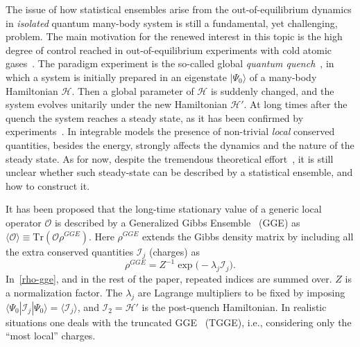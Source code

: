 \documentclass[twocolumn,superscriptaddress,prb,10pt]{revtex4-1}
\begin{document}
The issue of how statistical ensembles arise from the out-of-equilibrium 
dynamics in {\it isolated} quantum many-body system is still a fundamental, 
yet challenging, problem. The main motivation for the renewed interest 
in this topic is the high degree of control reached in out-of-equilibrium 
experiments with cold atomic gases~\cite{bloch-2008,greiner-2002,kinoshita-2006,
hofferberth-2007,trotzky-2012,gring-2012,cheneau-2012,
schneider-2012,kunhert-2013,langen-2013,meinert-2013,fukuhara-2013,
ronzheimer-2013,braun-2014,langen-2015}. The paradigm experiment is the so-called global 
{\it quantum quench}~\cite{polkovnikov-2011}, in which a system is initially 
prepared in an eigenstate $|\Psi_0\rangle$ of a many-body Hamiltonian ${\mathcal 
H}$. Then a global parameter of ${\mathcal H}$ is suddenly changed, and the 
system evolves unitarily under the new Hamiltonian ${\mathcal H}'$. At long times 
after the quench the system reaches a steady state, as it has been confirmed by 
experiments~\cite{kinoshita-2006}. In integrable models the 
presence of non-trivial {\it local} conserved quantities, besides the energy, 
strongly affects the dynamics and the nature of the steady state. As for now,  
despite the tremendous theoretical effort~\cite{calabrese-2006,rigol-2007,calabrese-2007,
kollath-2007,manmana-2007,rigol-2008,cramer-2008,barthel-2008,kollar-2008,moeckel-2008,
iucci-2009,rossini-2009,barmettler-2009,biroli-2010,rossini-2010,fioretto-2010,
gogolin-2011,banuls-2011,calabrese-2011,rigol-2011,calabrese-2012,caux-2012,essler-2012,
cazalilla-2012,mossel-2012a,collura-2013,mussardo-2013,caux-2013,fagotti-2013a,fagotti-2013,
sotiriadis-2014,fagotti-2014,essler-2014,goldstein-2014,de-nardis-2014,wright-2014,
pozsgay-2014,wouters-2014,mestyian-2015,ilievski-2015a}, 
it is still unclear whether such steady-state can be described by a statistical 
ensemble, and how to construct it. 

It has been proposed that the long-time stationary value of a generic 
local operator ${\mathcal O}$ is described by a Generalized Gibbs Ensemble~\cite{
rigol-2007,rigol-2008} (GGE) as $\langle{\mathcal O}\rangle\equiv\textrm{Tr}({\mathcal O}
\rho^{GGE})$. Here $\rho^{GGE}$ extends the Gibbs density matrix by including  all 
the extra conserved quantities $ {\mathcal I}_j$ (charges) as 
%
\begin{equation}
\rho^{GGE}=Z^{-1}\exp\big(-\lambda_j{\mathcal I}_j\big). 
\label{rho-gge}
\end{equation}
%
In~\eqref{rho-gge}, and in the rest of the paper, repeated indices are summed over. 
$Z$ is a normalization factor. The $\lambda_j$ are Lagrange multipliers to be fixed 
by imposing $\langle\Psi_0|{\mathcal I}_j|\Psi_0\rangle=\langle{\mathcal 
I}_j\rangle$, and ${\mathcal I}_2={\mathcal H}'$ is the post-quench Hamiltonian. 
In realistic situations one deals with the truncated GGE~\cite{fagotti-2013} (TGGE), 
i.e., considering only the ``most local'' charges. 
\end{document}
